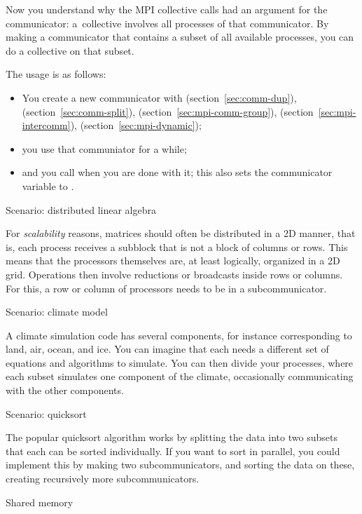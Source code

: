 Now you understand why the MPI collective calls had an argument for the
communicator: a~collective involves all processes of that communicator.
By making a communicator that contains a subset of all available processes,
you can do a collective on that subset.

The usage is as follows:
\begin{itemize}
\item You create a new communicator with 
  (section~\ref{sec:comm-dup}),
   (section~\ref{sec:comm-split}),
   (section~\ref{sec:mpi-comm-group}),
   (section~\ref{sec:mpi-intercomm}),
   (section~\ref{sec:mpi-dynamic});
\item you use that communiator for a while;
\item and you call  when you are done with it;
  this also sets the communicator variable to .
\end{itemize}

 {Scenario: distributed linear algebra}

For \emph{scalability} reasons, matrices should often be distributed
in a 2D manner, that is, each process receives a subblock that is not
a block of columns or rows. This means that the processors themselves
are, at least logically, organized in a 2D grid. Operations
then involve reductions or broadcasts inside rows or columns. For
this, a row or column of processors needs to be in a subcommunicator.

 {Scenario: climate model}

A climate simulation code has several components, for instance corresponding
to land, air, ocean, and ice. You can imagine that each needs a different set
of equations and algorithms to simulate. You can then divide your processes,
where each subset simulates one component of the climate, occasionally communicating
with the other components.

 {Scenario: quicksort}

The popular quicksort algorithm works by splitting the data
into two subsets that each can be sorted individually.
If you want to sort in parallel, you could implement this by making two subcommunicators,
and sorting the data on these, creating recursively more subcommunicators.

 {Shared memory}

